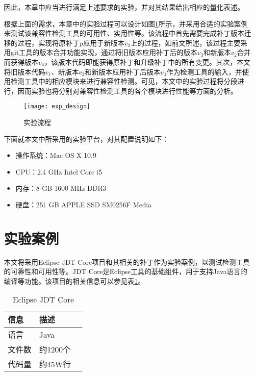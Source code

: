 因此，本章中应当进行满足上述要求的实验，并对其结果给出相应的量化表述。

根据上面的需求，本章中的实验过程可以设计如图\ref {des_exp}所示，并采用合适的实验案例来测试该兼容性检测工具的可用性、实用性等。该流程中首先需要完成补丁版本迁移的过程，实现将原补丁p应用于新版本$v_2$上的过程，如前文所述，该过程主要采用git工具的版本合并功能实现，通过将旧版本应用补丁后的版本$v_3$和新版本$v_2$合并而获得版本$v_4$，该版本代码即能获得原补丁和升级补丁中的所有变更。其次，本文将旧版本代码$v_1$、新版本$v_2$和新版本应用补丁后版本$v_4$作为检测工具的输入，并使用检测工具中的相应模块来进行兼容性检测。可见，本文中的实验过程将分段进行，因而实验也将分别对兼容性检测工具的各个模块进行性能等方面的分析。

\begin{figure}[H]
	\centering
	\texttt{[image: exp\_design]}
	\caption {实验流程}
	\label {des_exp}	
\end{figure}


下面就本文中所采用的实验平台，对其配置说明如下：
\begin{itemize}
	\item 操作系统：Mac OS X 10.9
	\item CPU：2.4 GHz Intel Core i5
	\item 内存：8 GB 1600 MHz DDR3
	\item 硬盘：251 GB APPLE SSD SM0256F Media
\end{itemize}

\section{实验案例}
\label {exp_data}

本文将采用Eclipse JDT Core项目和其相关的补丁作为实验案例，以测试检测工具的可靠性和可用性等。JDT Core是Eclipse工具的基础组件，用于支持Java语言的编译等功能。该项目的相关信息可以参见表\ref {jdt_core}。

\begin{table}[H]
	\caption{Eclipse JDT Core}
	\label{jdt_core}
	\centering
	\begin{tabular}{llc}
		\toprule[1.5pt]
		{\heiti 信息} & {\heiti 描述} \\\midrule[1pt]
		语言 & Java \\
		文件数 & 约1200个\\
		代码量 & 约45W行\\
		\bottomrule[1.5pt]
	\end{tabular}
\end{table}

